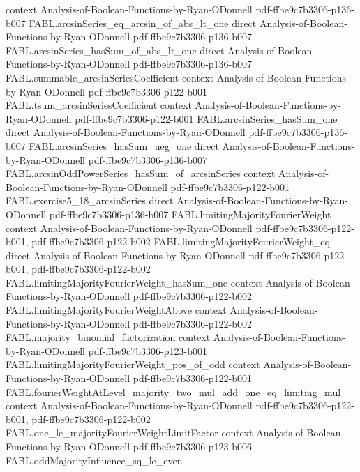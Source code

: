 \begin{theorem}
  {context}
  {Analysis-of-Boolean-Functions-by-Ryan-ODonnell}
  {pdf-ffbe9c7b3306-p136-b007}
\proofstep
  {FABL.arcsinSeries_eq_arcsin_of_abs_lt_one}
  {direct}
  {Analysis-of-Boolean-Functions-by-Ryan-ODonnell}
  {pdf-ffbe9c7b3306-p136-b007}
\proofstep
  {FABL.arcsinSeries_hasSum_of_abs_lt_one}
  {direct}
  {Analysis-of-Boolean-Functions-by-Ryan-ODonnell}
  {pdf-ffbe9c7b3306-p136-b007}
\proofstep
  {FABL.summable_arcsinSeriesCoefficient}
  {context}
  {Analysis-of-Boolean-Functions-by-Ryan-ODonnell}
  {pdf-ffbe9c7b3306-p122-b001}
\proofstep
  {FABL.tsum_arcsinSeriesCoefficient}
  {context}
  {Analysis-of-Boolean-Functions-by-Ryan-ODonnell}
  {pdf-ffbe9c7b3306-p122-b001}
\proofstep
  {FABL.arcsinSeries_hasSum_one}
  {direct}
  {Analysis-of-Boolean-Functions-by-Ryan-ODonnell}
  {pdf-ffbe9c7b3306-p136-b007}
\proofstep
  {FABL.arcsinSeries_hasSum_neg_one}
  {direct}
  {Analysis-of-Boolean-Functions-by-Ryan-ODonnell}
  {pdf-ffbe9c7b3306-p136-b007}
\proofstep
  {FABL.arcsinOddPowerSeries_hasSum_of_arcsinSeries}
  {context}
  {Analysis-of-Boolean-Functions-by-Ryan-ODonnell}
  {pdf-ffbe9c7b3306-p122-b001}
\proofstep
  {FABL.exercise5_18_arcsinSeries}
  {direct}
  {Analysis-of-Boolean-Functions-by-Ryan-ODonnell}
  {pdf-ffbe9c7b3306-p136-b007}
\proofstep
  {FABL.limitingMajorityFourierWeight}
  {context}
  {Analysis-of-Boolean-Functions-by-Ryan-ODonnell}
  {pdf-ffbe9c7b3306-p122-b001,
    pdf-ffbe9c7b3306-p122-b002}
\proofstep
  {FABL.limitingMajorityFourierWeight_eq}
  {direct}
  {Analysis-of-Boolean-Functions-by-Ryan-ODonnell}
  {pdf-ffbe9c7b3306-p122-b001,
    pdf-ffbe9c7b3306-p122-b002}
\proofstep
  {FABL.limitingMajorityFourierWeight_hasSum_one}
  {context}
  {Analysis-of-Boolean-Functions-by-Ryan-ODonnell}
  {pdf-ffbe9c7b3306-p122-b002}
\proofstep
  {FABL.limitingMajorityFourierWeightAbove}
  {context}
  {Analysis-of-Boolean-Functions-by-Ryan-ODonnell}
  {pdf-ffbe9c7b3306-p122-b002}
\proofstep
  {FABL.majority_binomial_factorization}
  {context}
  {Analysis-of-Boolean-Functions-by-Ryan-ODonnell}
  {pdf-ffbe9c7b3306-p123-b001}
\proofstep
  {FABL.limitingMajorityFourierWeight_pos_of_odd}
  {context}
  {Analysis-of-Boolean-Functions-by-Ryan-ODonnell}
  {pdf-ffbe9c7b3306-p122-b001}
\proofstep
  {FABL.fourierWeightAtLevel_majority_two_mul_add_one_eq_limiting_mul}
  {context}
  {Analysis-of-Boolean-Functions-by-Ryan-ODonnell}
  {pdf-ffbe9c7b3306-p122-b001,
    pdf-ffbe9c7b3306-p122-b002}
\proofstep
  {FABL.one_le_majorityFourierWeightLimitFactor}
  {context}
  {Analysis-of-Boolean-Functions-by-Ryan-ODonnell}
  {pdf-ffbe9c7b3306-p123-b006}
\proofstep
  {FABL.oddMajorityInfluence_sq_le_even}

\end{theorem}

